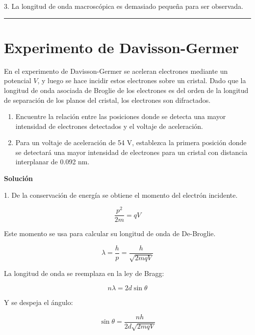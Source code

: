 \documentclass[12pt]{article}
\begin{document}
3. La longitud de onda macroscópica es demasiado pequeña para ser observada.


\noindent\rule{16.5cm}{0.4pt}





\section{Experimento de Davisson-Germer}

 En el experimento de Davisson-Germer se aceleran electrones mediante un potencial $V$, y luego
se hace incidir estos electrones sobre un cristal. Dado que la longitud de onda asociada de Broglie de los
electrones es del orden de la longitud de separación de los planos del cristal, los electrones son
difractados.

\begin{enumerate}
	\item Encuentre  la relación entre las posiciones donde se detecta una mayor intensidad de electrones
	detectados y el voltaje de aceleración.
	\item Para un voltaje de aceleración de 54 V, establezca la primera posición donde se detectará una
	mayor intensidad de electrones para un cristal con distancia interplanar de 0.092 nm.
\end{enumerate}


\begin{center}
	\textbf{Solución}
\end{center}


1. De la conservación de energía se obtiene el momento del electrón incidente.

\begin{equation*}
\frac{p^2}{2m} = q V
\end{equation*}

 Este momento se usa para calcular su longitud de onda de De-Broglie.

\begin{equation*}
\lambda = \frac{h}{p} = \frac{h}{\sqrt{2 m q V}}
\end{equation*}

La longitud de onda se reemplaza en la ley de Bragg:

\begin{equation}
n\lambda = 2 d \sin\theta
\end{equation}

Y se despeja el ángulo:

\begin{equation}
\sin\theta =   \frac{nh}{2d\sqrt{2 m q V}}
\end{equation}
\end{document}
